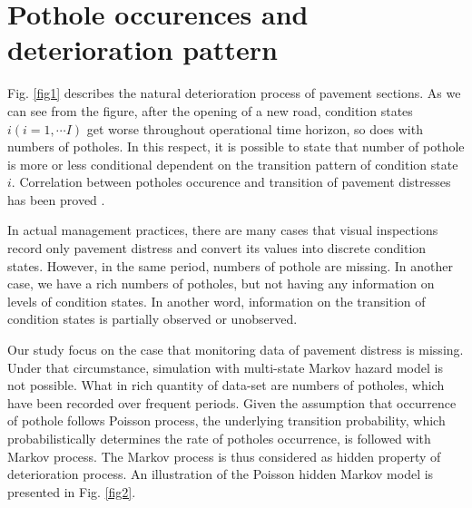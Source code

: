 \documentclass[a4paper,oneside,onecolumn,preprint,10pt,authoryear]{elsarticle}
\begin{document}
\section{Pothole occurences and deterioration pattern}
\label{sec3}
Fig. \ref{fig1} describes the natural deterioration process of pavement sections. As we can see from the figure, after the opening of a new road, condition states $i(i=1,\cdots I)$ get worse throughout operational time horizon, so does with numbers of potholes. In this respect, it is possible to state that number of pothole is more or less conditional dependent on the transition pattern of condition state $i$. Correlation between potholes occurence and transition of pavement distresses has been proved \citep{donglin03}. 

In actual management practices, there are many cases that visual inspections record only pavement distress and convert its values into discrete condition states. However, in the same period, numbers of pothole are missing. In another case, we have a rich numbers of potholes, but not having any information on levels of condition states. In another word, information on the transition of condition states is partially observed or unobserved.

Our study focus on the case that monitoring data of pavement distress is missing. Under that circumstance, simulation with multi-state Markov hazard model is not possible. What in rich quantity of data-set are numbers of potholes, which have been recorded over frequent periods. Given the assumption that occurrence of pothole follows Poisson process, the underlying transition probability, which probabilistically determines the rate of potholes occurrence, is followed with Markov process. The Markov process is thus considered as hidden property of deterioration process. An illustration of the Poisson hidden Markov model is presented in Fig. \ref{fig2}.
\end{document}
